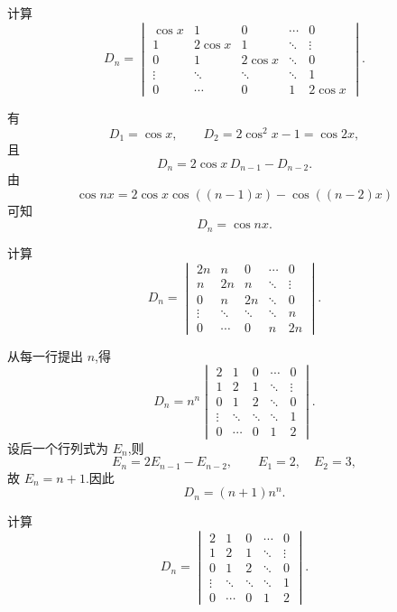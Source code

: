 \begin{example}
计算
\[
D_n=
\begin{vmatrix}
\cos x & 1 & 0 & \cdots & 0\\
1 & 2\cos x & 1 & \ddots & \vdots\\
0 & 1 & 2\cos x & \ddots & 0\\
\vdots & \ddots & \ddots & \ddots & 1\\
0 & \cdots & 0 & 1 & 2\cos x
\end{vmatrix}.
\]
\end{example}
\exampleblank

\begin{solution}
有
\[
D_1=\cos x,\qquad
D_2=2\cos^2x-1=\cos2x,
\]
且
\[
D_n=2\cos x\,D_{n-1}-D_{n-2}.
\]
由
\[
\cos nx
=
2\cos x\cos((n-1)x)-\cos((n-2)x)
\]
可知
\[
\boxed{D_n=\cos nx}.
\]
\end{solution}


\begin{example}
计算
\[
D_n=
\begin{vmatrix}
2n & n & 0 & \cdots & 0\\
n & 2n & n & \ddots & \vdots\\
0 & n & 2n & \ddots & 0\\
\vdots & \ddots & \ddots & \ddots & n\\
0 & \cdots & 0 & n & 2n
\end{vmatrix}.
\]
\end{example}
\exampleblank

\begin{solution}
从每一行提出 $n$,得
\[
D_n
=
n^n
\begin{vmatrix}
2 & 1 & 0 & \cdots & 0\\
1 & 2 & 1 & \ddots & \vdots\\
0 & 1 & 2 & \ddots & 0\\
\vdots & \ddots & \ddots & \ddots & 1\\
0 & \cdots & 0 & 1 & 2
\end{vmatrix}.
\]
设后一个行列式为 $E_n$,则
\[
E_n=2E_{n-1}-E_{n-2},
\qquad
E_1=2,\quad E_2=3,
\]
故 $E_n=n+1$.因此
\[
\boxed{D_n=(n+1)n^n}.
\]
\end{solution}


\begin{example}
计算
\[
D_n=
\begin{vmatrix}
2 & 1 & 0 & \cdots & 0\\
1 & 2 & 1 & \ddots & \vdots\\
0 & 1 & 2 & \ddots & 0\\
\vdots & \ddots & \ddots & \ddots & 1\\
0 & \cdots & 0 & 1 & 2
\end{vmatrix}.
\]
\end{example}
\exampleblank

